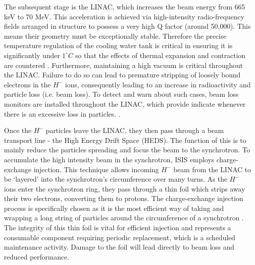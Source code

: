 \documentclass[10pt,oneside]{report}
\begin{document}
The subsequent stage is the LINAC, which increases the beam energy from 665 keV to 70 MeV. This acceleration is achieved via high-intensity radio-frequency fields arranged in structure to possess a very high Q factor \cite{michael2006electronic} (around 50,000). This means their geometry must be exceptionally stable. Therefore the precise temperature regulation of the cooling water tank is critical in ensuring it is significantly under $1^\circ C$ so that the effects of thermal expansion and contraction are countered \cite{2021practicalguide}. Furthermore, maintaining a high vacuum is critical throughout the LINAC. Failure to do so can lead to premature stripping of loosely bound electrons in the $H^-$ ions, consequently leading to an increase in radioactivity and particle loss (i.e. beam loss). To detect and warn about such cases, beam loss monitors are installed throughout the LINAC, which provide indicate whenever there is an excessive loss in particles. \cite{2021practicalguide}.

Once the $H^-$ particles leave the LINAC, they then pass through a beam transport line - the High Energy Drift Space (HEDS). The function of this is to mainly reduce the particles spreading and focus the beam to the synchrotron. To accumulate the high intensity beam in the synchrotron, ISIS employs charge-exchange injection. This technique allows incoming $H^-$ beam from the LINAC to be `layered' into the synchrotron's circumference over many turns. As the $H^-$ ions enter the synchrotron ring, they pass through a thin foil which strips away their two electrons, converting them to protons. The charge-exchange injection process is specifically chosen as it is the most efficient way of taking and wrapping a long string of particles around the circumference of a synchrotron \cite{2021practicalguide, ankenbrandt1980h}. The integrity of this thin foil is vital for efficient injection and represents a consumable component requiring periodic replacement, which is a scheduled maintenance activity. Damage to the foil will lead directly to beam loss and reduced performance.
\end{document}
